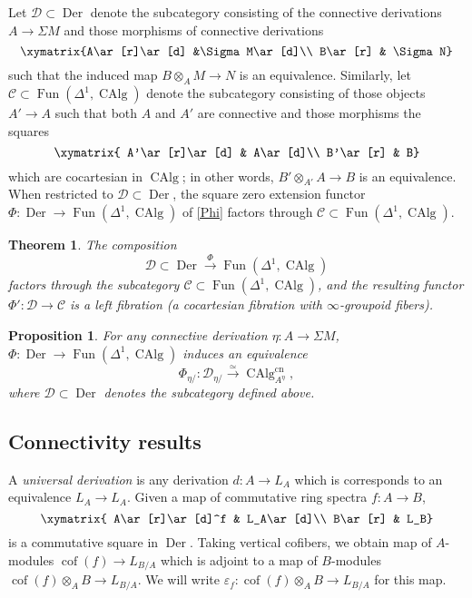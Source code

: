 \documentclass[12pt]{article}
\newtheorem{theorem}{Theorem}[subsection]
\newtheorem{proposition}{Proposition}[subsection]
\theoremstyle{definition}
\newcommand{\C}{\mathcal{C}}
\newcommand{\D}{\mathcal{D}}
\renewcommand{\i}{\infty}
\newcommand{\too}{\longrightarrow}
\DeclareMathOperator{\CAlg}{CAlg}
\DeclareMathOperator{\cof}{cof}
\DeclareMathOperator{\Der}{Der}
\DeclareMathOperator{\Fun}{Fun}
\newcommand{\cn}{\mathrm{cn}}
\renewcommand{\epsilon}{\varepsilon}
\begin{document}
Let $\D\subset\Der$ denote the subcategory consisting of the connective derivations $A\to\Sigma M$ and those morphisms of connective derivations
\[
\xymatrix{A\ar[r]\ar[d] &\Sigma M\ar[d]\\
B\ar[r] & \Sigma N}
\]
such that the induced map $B\otimes_A M\to N$ is an equivalence.
Similarly, let $\C\subset\Fun(\Delta^1,\CAlg)$ denote the subcategory consisting of those objects $A'\to A$ such that both $A$ and $A'$ are connective and those morphisms the squares
\[
\xymatrix{
A'\ar[r]\ar[d] & A\ar[d]\\
B'\ar[r] & B}
\]
which are cocartesian in $\CAlg$; in other words, $B'\otimes_{A'} A\to B$ is an equivalence.
When restricted to $\D\subset\Der$, the square zero extension functor $\Phi:\Der\to\Fun(\Delta^1,\CAlg)$ of \autoref{Phi} factors through $\C\subset\Fun(\Delta^1,\CAlg)$.
\begin{theorem}{\em \cite[Theorem 7.4.2.7]{HA}}\label{thm:lf}
The composition
\[
\D\subset\Der\overset{\Phi}{\too}\Fun(\Delta^1,\CAlg)
\]
factors through the subcategory $\C\subset\Fun(\Delta^1,\CAlg)$, and the resulting functor $\Phi':\D\to\C$ is a left fibration (a cocartesian fibration with $\i$-groupoid fibers).
\end{theorem}


\begin{proposition}{\em \cite[Proposition 7.4.2.5]{HA}}\label{prop:key}
For any connective derivation $\eta:A\to\Sigma M$,
$\Phi:\Der\to\Fun(\Delta^1,\CAlg)$ induces an equivalence
\[
\Phi_{\eta/}:\D_{\eta/}\overset{\simeq}{\too}\CAlg^{\cn}_{A^\eta},
\]
where $\D\subset\Der$ denotes the subcategory defined above.
\end{proposition}


\subsection{Connectivity results}


A {\em universal derivation}
is any derivation $d:A\to L_A$ which is corresponds to an equivalence $L_A\to L_A$.
Given a map of commutative ring spectra $f:A\to B$,
\[
\xymatrix{
A\ar[r]\ar[d]^f & L_A\ar[d]\\
B\ar[r] & L_B}
\]
is a commutative square in $\Der$.
Taking vertical cofibers, we obtain map of $A$-modules $\cof(f)\to L_{B/A}$ which is adjoint to a map of $B$-modules $\cof(f)\otimes_A B\to L_{B/A}$.
We will write $\epsilon_f:\cof(f)\otimes_A B\to L_{B/A}$ for this map.
\end{document}
